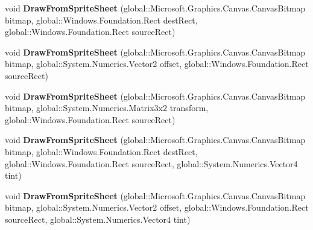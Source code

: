 \begin{DoxyCompactItemize}
\item 
\mbox{\label{class_microsoft_1_1_graphics_1_1_canvas_1_1_canvas_sprite_batch_aad806d7034e245c959c707dc4391e844}} 
void {\bfseries Draw\+From\+Sprite\+Sheet} (global\+::\+Microsoft.\+Graphics.\+Canvas.\+Canvas\+Bitmap bitmap, global\+::\+Windows.\+Foundation.\+Rect dest\+Rect, global\+::\+Windows.\+Foundation.\+Rect source\+Rect)
\item 
\mbox{\label{class_microsoft_1_1_graphics_1_1_canvas_1_1_canvas_sprite_batch_a92f0f8a12c6342a95d48002a8fd3b11c}} 
void {\bfseries Draw\+From\+Sprite\+Sheet} (global\+::\+Microsoft.\+Graphics.\+Canvas.\+Canvas\+Bitmap bitmap, global\+::\+System.\+Numerics.\+Vector2 offset, global\+::\+Windows.\+Foundation.\+Rect source\+Rect)
\item 
\mbox{\label{class_microsoft_1_1_graphics_1_1_canvas_1_1_canvas_sprite_batch_a0d74b7bfe143a9832126256d47c187e6}} 
void {\bfseries Draw\+From\+Sprite\+Sheet} (global\+::\+Microsoft.\+Graphics.\+Canvas.\+Canvas\+Bitmap bitmap, global\+::\+System.\+Numerics.\+Matrix3x2 transform, global\+::\+Windows.\+Foundation.\+Rect source\+Rect)
\item 
\mbox{\label{class_microsoft_1_1_graphics_1_1_canvas_1_1_canvas_sprite_batch_ad98b847473221fdac7fbd14a5b9be240}} 
void {\bfseries Draw\+From\+Sprite\+Sheet} (global\+::\+Microsoft.\+Graphics.\+Canvas.\+Canvas\+Bitmap bitmap, global\+::\+Windows.\+Foundation.\+Rect dest\+Rect, global\+::\+Windows.\+Foundation.\+Rect source\+Rect, global\+::\+System.\+Numerics.\+Vector4 tint)
\item 
\mbox{\label{class_microsoft_1_1_graphics_1_1_canvas_1_1_canvas_sprite_batch_af857e8b6752567fefd4c6a81a75b2e21}} 
void {\bfseries Draw\+From\+Sprite\+Sheet} (global\+::\+Microsoft.\+Graphics.\+Canvas.\+Canvas\+Bitmap bitmap, global\+::\+System.\+Numerics.\+Vector2 offset, global\+::\+Windows.\+Foundation.\+Rect source\+Rect, global\+::\+System.\+Numerics.\+Vector4 tint)
\item 
\mbox{\label{class_microsoft_1_1_graphics_1_1_canvas_1_1_canvas_sprite_batch_a757d700dcc20d105cec1a69997f48951}} 

\end{DoxyCompactItemize}
